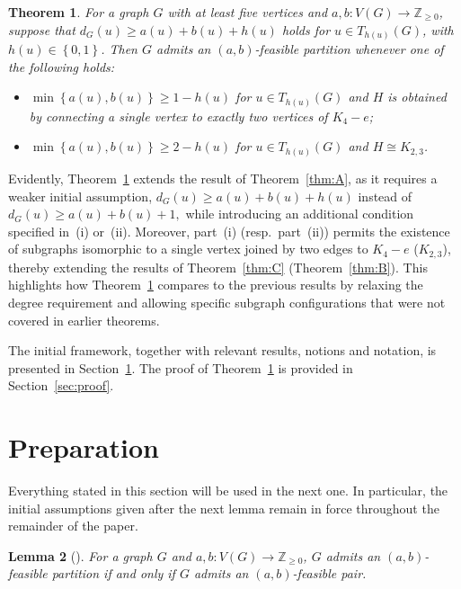 \documentclass[11p]{elsarticle}
\newtheorem{theorem}{Theorem}[section]
\newtheorem{lemma}[theorem]{Lemma}
\theoremstyle{definition}
\begin{document}
\begin{theorem}\label{13t}
	For a graph $ G $  with at least five vertices and $ a,b\colon V(G)\longrightarrow \mathbb{Z}_{\ge 0}$, suppose that  $ d_G(u)\ge a(u)+b(u)+h(u)$ holds  for $u\in T_{h(u)}(G)$, with $ h(u)\in \left\lbrace 0,1\right\rbrace$. Then $G$ admits an  $(a,b)$-feasible partition whenever one of the following holds:
	\begin{itemize} \item[(i)] $\min \left\lbrace a(u),b(u)\right\rbrace\ge 1-h(u)$ for $u\in T_{h(u)}(G)$ and $H$ is  obtained   by connecting a single vertex to exactly two vertices of $ K_{4} -e $;
		\item[(ii)] $\min \left\lbrace a(u),b(u)\right\rbrace\ge 2-h(u)$ for $u\in T_{h(u)}(G)$  and  $H\cong K_{2,3}$.
		\end{itemize}
\end{theorem}	

Evidently, Theorem~\ref{13t} extends the result of Theorem~\ref{thm:A}, as it requires a weaker initial assumption, $
d_G(u) \ge a(u) + b(u) + h(u)$
instead of
$
d_G(u) \ge a(u) + b(u) + 1,
$
while introducing an additional condition specified in~(i) or~(ii). Moreover, part~(i) (resp.~part~(ii)) permits the existence of subgraphs isomorphic to a single vertex joined by two edges to $K_4 - e$ ($K_{2,3}$), thereby extending the results of Theorem~\ref{thm:C} (Theorem~\ref{thm:B}). This highlights how Theorem~\ref{13t} compares to the previous results by  relaxing the degree requirement and allowing specific subgraph configurations that were not covered in earlier theorems. 

The initial framework, together with relevant results, notions and notation, is presented in Section~\ref{sec:prep}. The proof of Theorem~\ref{13t} is provided in Section~\ref{sec:proof}.

	\section{Preparation}\label{sec:prep}

Everything stated in this section will be used in the next one. In particular, the initial assumptions given after  the next lemma remain in force throughout the remainder of the paper. 

\begin{lemma}[\cite{Sti}]\label{21l}
	For a graph $ G $ and  $ a,b\colon V(G)\longrightarrow \mathbb{Z}_{\ge 0}$, $ G $ admits an $ (a,b) $-feasible partition if and only if $ G $ admits an $ (a,b) $-feasible pair.
\end{lemma}
\end{document}

